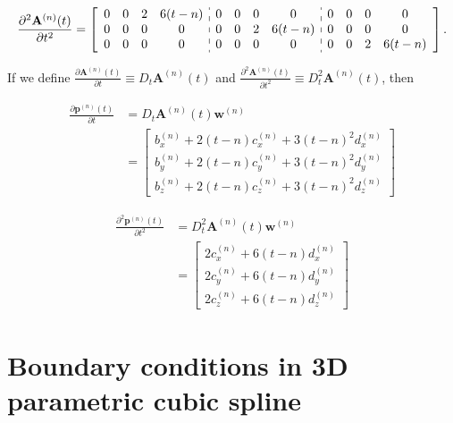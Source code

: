 \small
\begin{equation}\label{eq:primeder2}
\frac{\partial^{2} \mathbf{A}^{(n)}(t)}{\partial t^{2}}=
\left[
\begin{array}{cccc:cccc:cccc}
0 & 0 & 2 & 6(t-n) &
0 & 0 & 0 & 0 &
0 & 0 & 0 & 0 \\
0 & 0 & 0 & 0 &
0 & 0 & 2 & 6(t-n) &
0 & 0 & 0 & 0 \\
0 & 0 & 0 & 0 &
0 & 0 & 0 & 0 &
0 & 0 & 2 & 6(t-n) 
\end{array}
\right].
\end{equation}
\normalsize

 If we define 
 $\frac{\partial \mathbf{A}^{(n)}(t)}{\partial t} \equiv D_{t}\mathbf{A}^{(n)}(t)$
 and
 $\frac{\partial^{2} \mathbf{A}^{(n)}(t)}{\partial t^{2}} \equiv D_{t}^{2}\mathbf{A}^{(n)}(t)$, 
 then
 
\begin{align}\label{eq:primeder3a}
\frac{\partial \mathbf{p}^{(n)}(t)}{\partial t}
&=
D_{t}\mathbf{A}^{(n)}(t) \mathbf{w}^{(n)} \\
~
&=
\begin{bmatrix}
b_{x}^{(n)}+2(t-n) c_{x}^{(n)}+3(t-n)^{2} d_{x}^{(n)}\\
b_{y}^{(n)}+2(t-n) c_{y}^{(n)}+3(t-n)^{2} d_{y}^{(n)}\\
b_{z}^{(n)}+2(t-n) c_{z}^{(n)}+3(t-n)^{2} d_{z}^{(n)}
\end{bmatrix}
\end{align}


\begin{align}\label{eq:primeder3b}
\frac{\partial^{2} \mathbf{p}^{(n)}(t)}{\partial t^{2}}
&=
D_{t}^{2}\mathbf{A}^{(n)}(t) \mathbf{w}^{(n)}\\
~ 
&=
\begin{bmatrix}
2 c_{x}^{(n)}+6(t-n) d_{x}^{(n)}\\
2 c_{y}^{(n)}+6(t-n) d_{y}^{(n)}\\
2 c_{z}^{(n)}+6(t-n) d_{z}^{(n)}
\end{bmatrix}
\end{align}




\section{Boundary conditions in 3D parametric cubic spline}\label{sec:boundarycubic}

